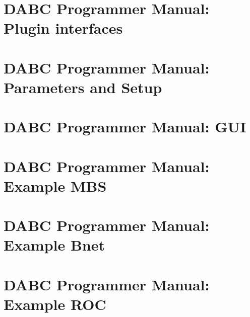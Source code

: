 
 \cleardoublepage
\chapter{DABC Programmer Manual: Plugin interfaces}
 \cleardoublepage
\chapter{DABC Programmer Manual: Parameters and Setup}
 \cleardoublepage
\chapter{DABC Programmer Manual: GUI}
 \cleardoublepage
\chapter{DABC Programmer Manual: Example MBS}
 \cleardoublepage
\chapter{DABC Programmer Manual: Example Bnet}
 \cleardoublepage
\chapter{DABC Programmer Manual: Example ROC}
 \cleardoublepage
